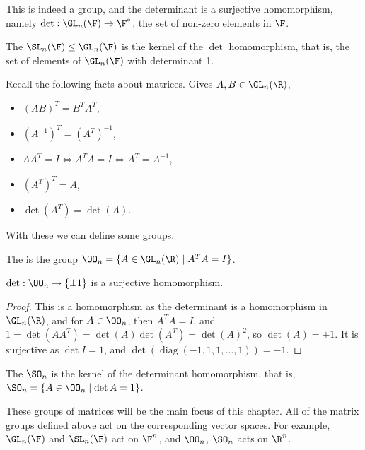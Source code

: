 \documentclass[a4]{scrreprt}
\begin{document}
This is indeed a group, and the determinant is a surjective homomorphism, namely $\det : \GL_n(\F) \rightarrow \F^*$, the set of non-zero elements in $\F$.

\begin{definition}
	The  $\SL_n(\F) \leq \GL_n(\F)$ is the kernel of the $\det$ homomorphism, that is, the set of elements of $\GL_n(\F)$ with determinant 1.
\end{definition}

Recall the following facts about matrices. Gives $A, B \in \GL_n(\R)$,
\begin{itemize}
	\item $(AB)^T = B^T A^T$,
	\item $(A^{-1})^T = (A^T)^{-1}$,
	\item $AA^{T} = I \iff A^{T} A = I \iff A^T = A^{-1}$,
	\item $(A^T)^T = A$,
	\item $\det(A^T) = \det(A)$.
\end{itemize}
With these we can define some groups.

\begin{definition}
	The  is the group $\OO_n = \{A \in \GL_n(\R) \mid A^T A = I\}$.
\end{definition}

\begin{proposition}
	$\det : \OO_n \rightarrow \{\pm 1\}$ is a surjective homomorphism. 
\end{proposition}
\begin{proof}
	This is a homomorphism as the determinant is a homomorphism in $\GL_n(\R)$, and for $A \in \OO_n$, then $A^T A = I$, and $1 = \det(A A^T) = \det(A)\det(A^T) = \det(A)^2$, so $\det(A) = \pm 1$. It is surjective as $\det I = 1$, and $\det(\operatorname{diag}(-1, 1, 1, \dots, 1)) = -1$.
\end{proof}

\begin{definition}
	The  $\SO_n$ is the kernel of the determinant homomorphism, that is, $\SO_n = \{A \in \OO_n \mid \det A = 1 \}$.
\end{definition}

These groups of matrices will be the main focus of this chapter.
All of the matrix groups defined above act on the corresponding vector spaces. For example, $\GL_n(\F)$ and $\SL_n(\F)$ act on $\F^n$, and $\OO_n$, $\SO_n$ acts on $\R^n$.
\end{document}
